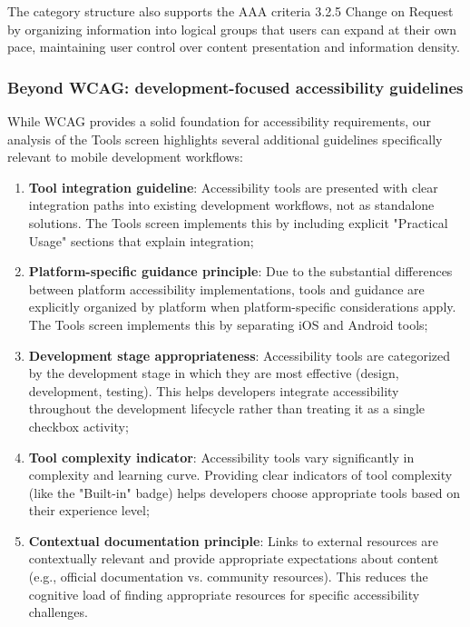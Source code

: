 The category structure also supports the AAA criteria 3.2.5 Change on Request by organizing information into logical groups that users can expand at their own pace, maintaining user control over content presentation and information density.

\subsubsection{Beyond WCAG: development-focused accessibility guidelines}

While WCAG provides a solid foundation for accessibility requirements, our analysis of the Tools screen highlights several additional guidelines specifically relevant to mobile development workflows:

\begin{enumerate}
    \item \textbf{Tool integration guideline}: Accessibility tools are presented with clear integration paths into existing development workflows, not as standalone solutions. The Tools screen implements this by including explicit "Practical Usage" sections that explain integration;
    
    \item \textbf{Platform-specific guidance principle}: Due to the substantial differences between platform accessibility implementations, tools and guidance are explicitly organized by platform when platform-specific considerations apply. The Tools screen implements this by separating iOS and Android tools;
    
    \item \textbf{Development stage appropriateness}: Accessibility tools are categorized by the development stage in which they are most effective (design, development, testing). This helps developers integrate accessibility throughout the development lifecycle rather than treating it as a single checkbox activity;
    
    \item \textbf{Tool complexity indicator}: Accessibility tools vary significantly in complexity and learning curve. Providing clear indicators of tool complexity (like the "Built-in" badge) helps developers choose appropriate tools based on their experience level;
    
    \item \textbf{Contextual documentation principle}: Links to external resources are contextually relevant and provide appropriate expectations about content (e.g., official documentation vs. community resources). This reduces the cognitive load of finding appropriate resources for specific accessibility challenges.
\end{enumerate}

